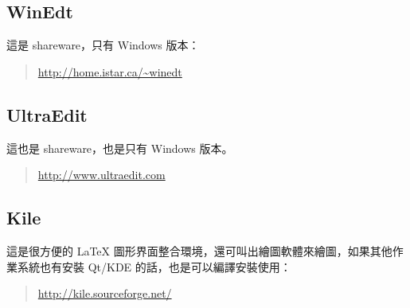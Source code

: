 \subsection{WinEdt}

這是 shareware，只有 Windows 版本：

\begin{quote}
   \url{http://home.istar.ca/~winedt}
\end{quote}

\subsection{UltraEdit}

這也是 shareware，也是只有 Windows 版本。

\begin{quote}
   \url{http://www.ultraedit.com}
\end{quote}

\subsection{Kile}

這是很方便的 \LaTeX{} 圖形界面整合環境，還可叫出繪圖軟體來繪圖，如果其他作業系統也有安裝 Qt/KDE 的話，也是可以編譯安裝使用：

\begin{quote}
   \url{http://kile.sourceforge.net/}
\end{quote}

